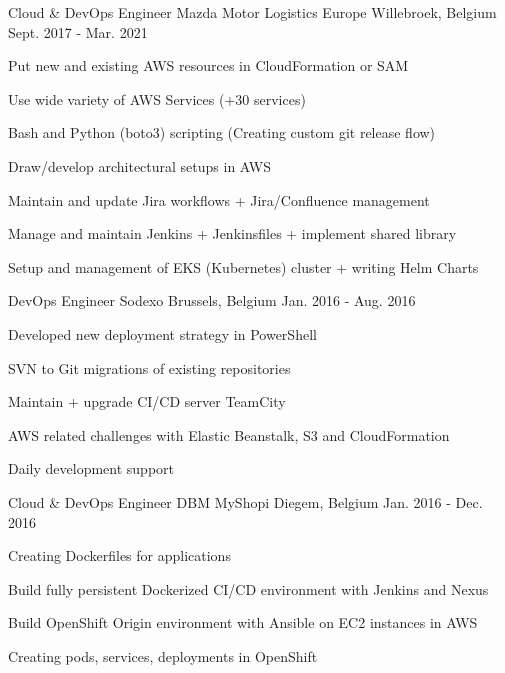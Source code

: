 \begin{cventries}
  \cventry
    {Cloud \& DevOps Engineer} %
    {Mazda Motor Logistics Europe} %
    {Willebroek, Belgium} %
    {Sept. 2017 - Mar. 2021} %
    {
      \begin{cvitems} %
        \item {Put new and existing AWS resources in CloudFormation or SAM}
        \item {Use wide variety of AWS Services (+30 services)}
        \item {Bash and Python (boto3) scripting (Creating custom git release flow)}
        \item {Draw/develop architectural setups in AWS}
        \item {Maintain and update Jira workflows + Jira/Confluence management}
        \item {Manage and maintain Jenkins + Jenkinsfiles + implement shared library}
        \item {Setup and management of EKS (Kubernetes) cluster + writing Helm Charts}
      \end{cvitems}
    }

  \cventry
    {DevOps Engineer} %
    {Sodexo} %
    {Brussels, Belgium} %
    {Jan. 2016 - Aug. 2016} %
    {
      \begin{cvitems} %
        \item {Developed new deployment strategy in PowerShell}
        \item {SVN to Git migrations of existing repositories}
        \item {Maintain + upgrade CI/CD server TeamCity}
        \item {AWS related challenges with Elastic Beanstalk, S3 and CloudFormation}
        \item {Daily development support}
      \end{cvitems}
    }

  \cventry
    {Cloud \& DevOps Engineer} %
    {DBM MyShopi} %
    {Diegem, Belgium} %
    {Jan. 2016 - Dec. 2016} %
    {
      \begin{cvitems} %
        \item {Creating Dockerfiles for applications}
        \item {Build fully persistent Dockerized CI/CD environment with Jenkins and Nexus}
        \item {Build OpenShift Origin environment with Ansible on EC2 instances in AWS}
        \item {Creating pods, services, deployments in OpenShift}
      \end{cvitems}
    }


\end{cventries}
